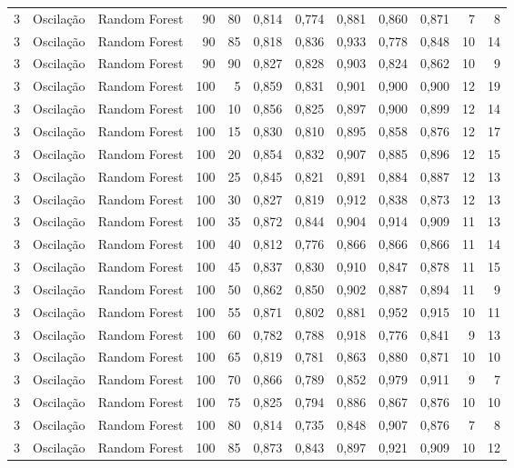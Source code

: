 \begin{longtable}{@{}rllrrrrrrrrr@{}}
3 & Oscilação & Random Forest & 90 & 80 & 0,814 & 0,774 & 0,881 & 0,860 & 0,871 & 7 & 8 \\
3 & Oscilação & Random Forest & 90 & 85 & 0,818 & 0,836 & 0,933 & 0,778 & 0,848 & 10 & 14 \\
3 & Oscilação & Random Forest & 90 & 90 & 0,827 & 0,828 & 0,903 & 0,824 & 0,862 & 10 & 9 \\
3 & Oscilação & Random Forest & 100 & 5 & 0,859 & 0,831 & 0,901 & 0,900 & 0,900 & 12 & 19 \\
3 & Oscilação & Random Forest & 100 & 10 & 0,856 & 0,825 & 0,897 & 0,900 & 0,899 & 12 & 14 \\
3 & Oscilação & Random Forest & 100 & 15 & 0,830 & 0,810 & 0,895 & 0,858 & 0,876 & 12 & 17 \\
3 & Oscilação & Random Forest & 100 & 20 & 0,854 & 0,832 & 0,907 & 0,885 & 0,896 & 12 & 15 \\
3 & Oscilação & Random Forest & 100 & 25 & 0,845 & 0,821 & 0,891 & 0,884 & 0,887 & 12 & 13 \\
3 & Oscilação & Random Forest & 100 & 30 & 0,827 & 0,819 & 0,912 & 0,838 & 0,873 & 12 & 13 \\
3 & Oscilação & Random Forest & 100 & 35 & 0,872 & 0,844 & 0,904 & 0,914 & 0,909 & 11 & 13 \\
3 & Oscilação & Random Forest & 100 & 40 & 0,812 & 0,776 & 0,866 & 0,866 & 0,866 & 11 & 14 \\
3 & Oscilação & Random Forest & 100 & 45 & 0,837 & 0,830 & 0,910 & 0,847 & 0,878 & 11 & 15 \\
3 & Oscilação & Random Forest & 100 & 50 & 0,862 & 0,850 & 0,902 & 0,887 & 0,894 & 11 & 9 \\
3 & Oscilação & Random Forest & 100 & 55 & 0,871 & 0,802 & 0,881 & 0,952 & 0,915 & 10 & 11 \\
3 & Oscilação & Random Forest & 100 & 60 & 0,782 & 0,788 & 0,918 & 0,776 & 0,841 & 9 & 13 \\
3 & Oscilação & Random Forest & 100 & 65 & 0,819 & 0,781 & 0,863 & 0,880 & 0,871 & 10 & 10 \\
3 & Oscilação & Random Forest & 100 & 70 & 0,866 & 0,789 & 0,852 & 0,979 & 0,911 & 9 & 7 \\
3 & Oscilação & Random Forest & 100 & 75 & 0,825 & 0,794 & 0,886 & 0,867 & 0,876 & 10 & 10 \\
3 & Oscilação & Random Forest & 100 & 80 & 0,814 & 0,735 & 0,848 & 0,907 & 0,876 & 7 & 8 \\
3 & Oscilação & Random Forest & 100 & 85 & 0,873 & 0,843 & 0,897 & 0,921 & 0,909 & 10 & 12 \\

\end{longtable}
